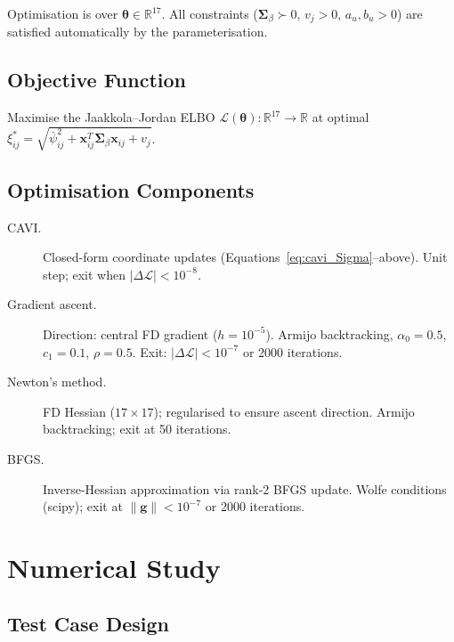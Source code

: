 \documentclass[11pt,a4paper]{article}
\newcommand{\R}{\mathbb{R}}
\begin{document}
Optimisation is over $\bm{\theta} \in \R^{17}$.
All constraints ($\bm{\Sigma}_\beta \succ 0$, $v_j > 0$, $a_u, b_u > 0$) are satisfied
automatically by the parameterisation.

\subsection*{Objective Function}

Maximise the Jaakkola--Jordan ELBO $\mathcal{L}(\bm{\theta}):\R^{17}\to\R$ at optimal
$\xi_{ij}^* = \sqrt{\bar{\psi}_{ij}^2 + \mathbf{x}_{ij}^T\bm{\Sigma}_\beta\mathbf{x}_{ij} + v_j}$.

\subsection*{Optimisation Components}

\begin{description}
\item[CAVI.]
  Closed-form coordinate updates (Equations~\ref{eq:cavi_Sigma}--above).
  Unit step; exit when $|\Delta\mathcal{L}| < 10^{-8}$.

\item[Gradient ascent.]
  Direction: central FD gradient ($h=10^{-5}$).
  Armijo backtracking, $\alpha_0=0.5$, $c_1=0.1$, $\rho=0.5$.
  Exit: $|\Delta\mathcal{L}| < 10^{-7}$ or 2000 iterations.

\item[Newton's method.]
  FD Hessian ($17\times17$); regularised to ensure ascent direction.
  Armijo backtracking; exit at 50 iterations.

\item[BFGS.]
  Inverse-Hessian approximation via rank-2 BFGS update.
  Wolfe conditions (scipy); exit at $\|\bm{g}\|<10^{-7}$ or 2000 iterations.
\end{description}

\section{Numerical Study}

\subsection{Test Case Design}
\end{document}
